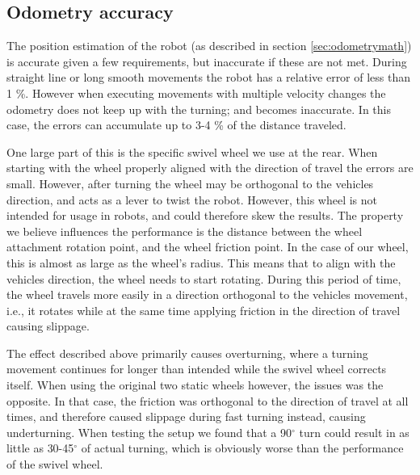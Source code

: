 \documentclass[11pt]{article}
\begin{document}
\subsection{Odometry accuracy\label{sec:odometry}}
The position estimation of the robot (as described in section
\vref{sec:odometrymath}) is accurate given a few requirements, but
inaccurate if these are not met. During straight line or long smooth movements
the robot has a relative error of less than 1 \%. However when executing
movements with multiple velocity changes the odometry does not keep up with the
turning; and becomes inaccurate. In this case, the errors can accumulate up to
3-4 \% of the distance traveled. \par

One large part of this is the specific swivel wheel we use at the rear. When
starting with the wheel properly aligned with the direction of travel the errors
are small. However, after turning the wheel may be orthogonal to the
vehicles direction, and acts as a lever to twist the robot. However, this wheel
is not intended for usage in robots, and could therefore skew the results. The
property we believe influences the performance is the distance between the wheel
attachment rotation point, and the wheel friction point. In the case of our
wheel, this is almost as large as the wheel's radius. This means that to align
with the vehicles direction, the wheel needs to start rotating. During this
period of time, the wheel travels more easily in a direction orthogonal to the
vehicles movement, i.e., it rotates while at the same time applying friction in
the direction of travel causing slippage. \par

The effect described above primarily causes overturning, where a turning
movement continues for longer than intended while the swivel wheel corrects
itself. When using the original two static wheels however, the issues was the
opposite. In that case, the friction was orthogonal to the direction of travel
at all times, and therefore caused slippage during fast turning instead, causing
underturning. When testing the setup we found that a 90$^\circ$ turn could
result in as little as {30-45}$^\circ$ of actual turning, which is obviously
 worse than the performance of the swivel wheel. \par
\end{document}
